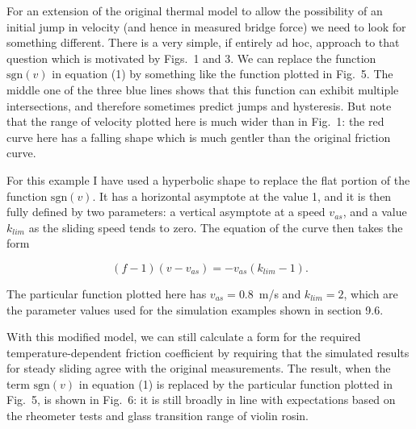   For an extension of the original thermal model to allow the possibility of an 
  initial jump in velocity (and hence in measured bridge force) we need to look 
  for something different. There is a very simple, if entirely ad hoc, approach 
  to that question which is motivated by Figs.\ 1 and 3. We can replace the 
  function $\mathrm{sgn}(v)$ in equation (1) by something like the function 
  plotted in Fig.\ 5. The middle one of the three blue lines shows that this 
  function can exhibit multiple intersections, and therefore sometimes predict 
  jumps and hysteresis. But note that the range of velocity plotted here is 
  much wider than in Fig.\ 1: the red curve here has a falling shape which is 
  much gentler than the original friction curve. 


  For this example I have used a hyperbolic shape to replace the flat portion 
  of the function $\mathrm{sgn}(v)$. It has a horizontal asymptote at the value 
  1, and it is then fully defined by two parameters: a vertical asymptote at a 
  speed $v_{as}$, and a value $k_{lim}$ as the sliding speed tends to zero. The 
  equation of the curve then takes the form 

  $$(f-1)(v-v_{as})=-v_{as} (k_{lim}-1) . \tag{3}$$ 

  The particular function plotted here has $v_{as}=0.8$ m/s and $k_{lim}=2$, 
  which are the parameter values used for the simulation examples shown in 
  section 9.6. 

  With this modified model, we can still calculate a form for the required 
  temperature-dependent friction coefficient by requiring that the simulated 
  results for steady sliding agree with the original measurements. The result, 
  when the term $\mathrm{sgn}(v)$ in equation (1) is replaced by the particular 
  function plotted in Fig.\ 5, is shown in Fig.\ 6: it is still broadly in line 
  with expectations based on the rheometer tests and glass transition range of 
  violin rosin. 


